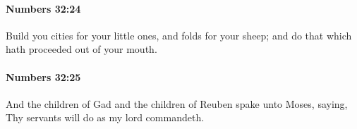		\paragraph{Numbers 32:24} %
			\label{NUMBERS-32-24}

			Build you cities for your little ones, and folds for your sheep; and do that which hath proceeded out of your mouth.


		\paragraph{Numbers 32:25} %
			\label{NUMBERS-32-25}

			And the children of Gad and the children of Reuben spake unto Moses, saying, Thy servants will do as my lord commandeth.


